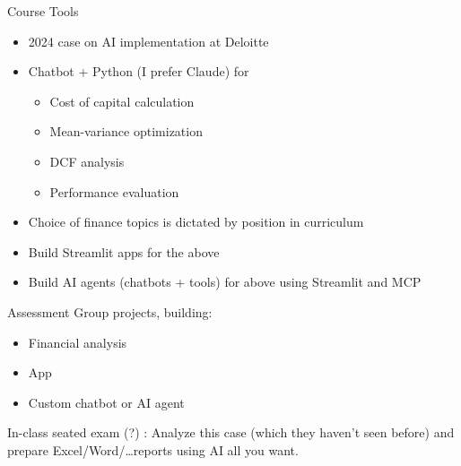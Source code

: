 \documentclass{beamer}
\begin{document}

\begin{frame}{Course Tools}
    \begin{itemize}
    \item 2024 case on AI implementation at Deloitte
    \pause
    \item Chatbot + Python (I prefer Claude) for 
    \begin{itemize}
    \item Cost of capital calculation
    \item Mean-variance optimization
    \item DCF analysis
    \item Performance evaluation
    \end{itemize}
    \pause
    \item Choice of finance topics is dictated by position in curriculum
    \pause
    \item Build Streamlit apps for the above
    \item Build AI agents (chatbots + tools) for above using Streamlit and MCP
    \end{itemize}
\end{frame}

\begin{frame}{Assessment}
    Group projects, building:
    \begin{itemize}
        \item Financial analysis
        \item App
        \item Custom chatbot or AI agent
    \end{itemize}
    In-class seated exam (?) : Analyze this case (which they haven't seen before) and prepare Excel/Word/\ldots reports \alert{using AI all you want}.
\end{frame}
\end{document}
